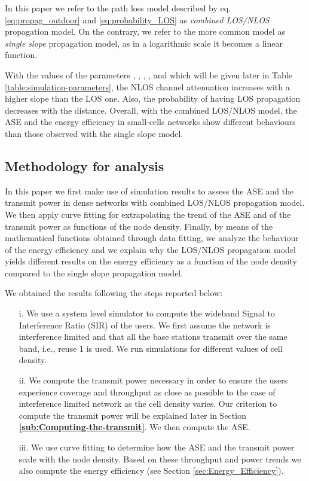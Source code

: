 \documentclass[twocoumn]{IEEEtran}
\begin{document}
In this paper we refer to the path loss model described by eq. \eqref{eq:propag_outdoor}
and \eqref{eq:probability_LOS} as \textit{combined LOS/NLOS} propagation
model. On the contrary, we refer to the more common model 
as \textit{single slope} propagation model, as in a logarithmic scale
it becomes a linear function. 

With the values of the parameters , , , ,  and  which will be given later in Table \ref{table:simulation-parameters}, the NLOS channel attenuation  increases with a higher slope than the LOS one. Also, the probability of having LOS propagation decreases with the distance. Overall, with the combined LOS/NLOS model, the ASE and the energy efficiency  in small-cells networks show different behaviours than those observed with the single slope model. 

\vspace{-3mm}
\subsection{Methodology for analysis} \label{sec:Methodology}

In this paper we first make use of simulation results to assess the ASE and the transmit power in dense networks with combined LOS/NLOS propagation model. We then apply curve fitting for extrapolating the trend of the ASE and of the transmit power as functions of the node density. Finally, by means of the mathematical functions obtained through data fitting, we analyze the behaviour of the energy efficiency and we explain why the LOS/NLOS propagation model yields different results on the energy efficiency as a function of the node
density compared to the single slope propagation model. 

\noindent We obtained the results following the steps reported below: 
\begin{enumerate}
\item[i.] We use a system level simulator to compute the wideband  Signal to Interference Ratio (SIR)
of the users. We first assume the network is interference limited and
that all the base stations transmit over the same band, i.e., reuse
1 is used. We run simulations for different values of cell density. 
\item[ii.] We compute the transmit power necessary in order to ensure the users
experience coverage and throughput as close as possible to the case
of interference limited network as the cell density varies. Our criterion
to compute the transmit power will be explained later in Section \textbf{\eqref{sub:Computing-the-transmit}}. We then compute the ASE.
\item[iii.] We use curve fitting to determine how the ASE and the transmit
power scale with the node density. Based on these throughput and power trends
we also compute the energy efficiency (see Section \ref{sec:Energy_Efficiency}). 
\end{enumerate}
\end{document}
